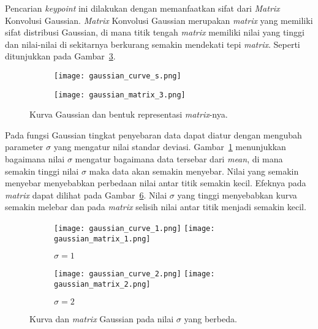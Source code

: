 Pencarian \textit{keypoint} ini dilakukan dengan memanfaatkan sifat dari \textit{Matrix} Konvolusi Gaussian. \textit{Matrix} Konvolusi Gaussian merupakan \textit{matrix} yang memiliki sifat distribusi Gaussian, di mana titik tengah \textit{matrix} memiliki nilai yang tinggi dan nilai-nilai di sekitarnya berkurang semakin mendekati tepi \textit{matrix}. Seperti ditunjukkan pada Gambar~\ref{fig:gaussian_function}. 
\begin{figure}[H]
	\begin{subfigure}[b]{.5\textwidth}
		\centering
		\texttt{[image: gaussian\_curve\_s.png]}
		\caption{}
		\label{subfig:gaussian_curve}
	\end{subfigure}%
	\begin{subfigure}[b]{.5\textwidth}
		\centering
		\texttt{[image: gaussian\_matrix\_3.png]}
		\caption{}
		\label{subfig:gaussian_matrix}
	\end{subfigure}
	\caption{Kurva Gaussian dan bentuk representasi \textit{matrix}-nya.}
	\label{fig:gaussian_function}
\end{figure}

Pada fungsi Gaussian tingkat penyebaran data dapat diatur dengan mengubah parameter $\sigma$ yang mengatur nilai standar deviasi. Gambar~\ref{subfig:gaussian_curve} menunjukkan bagaimana nilai $\sigma$ mengatur bagaimana data tersebar dari \textit{mean}, di mana semakin tinggi nilai $\sigma$ maka data akan semakin menyebar. Nilai yang semakin menyebar menyebabkan perbedaan nilai antar titik semakin kecil. Efeknya pada \textit{matrix} dapat dilihat pada Gambar~\ref{fig:gaussian_sigma}. Nilai $\sigma$ yang tinggi menyebabkan kurva semakin melebar dan pada \textit{matrix} selisih nilai antar titik menjadi semakin kecil.

\begin{figure}[H]
	\begin{subfigure}[b]{.5\textwidth}
		\centering
		\texttt{[image: gaussian\_curve\_1.png]}
		\texttt{[image: gaussian\_matrix\_1.png]}
		\caption{$\sigma=1$}
		\label{subfig:gaussian_sigma1}
	\end{subfigure}%
	\begin{subfigure}[b]{.5\textwidth}
		\centering
		\texttt{[image: gaussian\_curve\_2.png]}
		\texttt{[image: gaussian\_matrix\_2.png]}
		\caption{$\sigma=2$}
		\label{subfig:gaussian_sigma2}
	\end{subfigure}
	\caption{Kurva dan \textit{matrix} Gaussian pada nilai $\sigma$ yang berbeda.}
	\label{fig:gaussian_sigma}
\end{figure}

